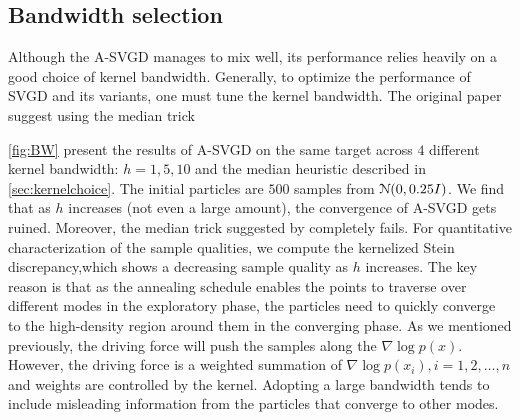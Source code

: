 \subsection{Bandwidth selection}

Although the A-SVGD manages to mix well, its performance relies heavily on a
good choice of kernel bandwidth. Generally, to optimize the performance of SVGD and its variants, one must tune the kernel bandwidth. The original paper \citep{liu2016stein} suggest using the median trick



\cref{fig:BW} present the results of A-SVGD
on the same target across $4$ different kernel bandwidth: $h = 1, 5, 10$ and
the median heuristic described in \cref{sec:kernelchoice}. The initial
particles are $500$ \iid samples from $\mathcal{N}(0, 0.25I)$. We find that as
$h$ increases (not even a large amount), the convergence of A-SVGD gets
ruined. Moreover, the median trick suggested by \citet{liu2016stein}
completely fails. For quantitative characterization of the sample qualities,
we compute the kernelized Stein discrepancy,which shows a decreasing sample
quality as $h$ increases. The key reason is that as the annealing schedule
enables the points to traverse over different modes in the exploratory phase,
the particles need to quickly converge to the high-density region around them
in the converging phase. As we mentioned previously, the driving force will
push the samples along the $\nabla \log p(x)$. However, the driving force is
a weighted summation of $\nabla \log p(x_i), i=1, 2, \dots, n$ and weights
are controlled by the kernel. Adopting a large bandwidth tends to include
misleading information from the particles that converge to other modes.


